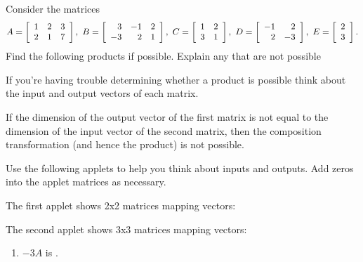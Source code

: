 \documentclass{ximera}
\author{Zack Reed}
\begin{document}
\begin{problem}

    Consider the matrices
    \begin{equation*}
      A = \startmat{rrr}
        1 & 2 & 3 \\
        2 & 1 & 7
      \stopmat,\quad
      B = \startmat{rrr}
        3 & -1 & 2 \\
        -3 & 2 & 1
      \stopmat,\quad
      C = \startmat{rr}
        1 & 2 \\
        3 & 1
      \stopmat,\quad
      D = \startmat{rr}
        -1 & 2 \\
        2 & -3
      \stopmat,\quad
      E = \startmat{r}
        2 \\
        3
      \stopmat.
    \end{equation*}
    Find the following products if possible. Explain any that are not possible

\begin{hint}

    If you're having trouble determining whether a product is possible think about the input and output vectors of each matrix. 

    If the dimension of the output vector of the first matrix is not equal to the dimension of the input vector of the second matrix, then the composition transformation (and hence the product) is not possible.

    Use the following applets to help you think about inputs and outputs. Add zeros into the applet matrices as necessary.

    The first applet shows 2x2 matrices mapping vectors:

    \begin{center}
    

    \end{center}

    The second applet shows 3x3 matrices mapping vectors:

    \begin{center}
    

    \end{center}

\end{hint}

    \begin{enumerate}
      \item $-3A$ is .
      \begin{problem}


\end{problem}
\end{enumerate}
\end{problem}
\end{document}
